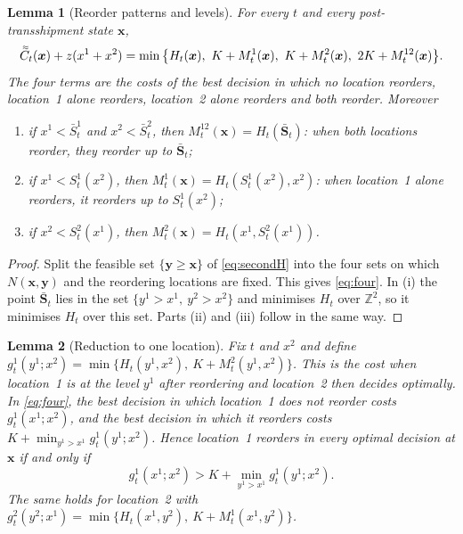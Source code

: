 \documentclass[11pt]{article}
\DeclareRobustCommand{\dbtilde}[1]{\accentset{\approx}{#1}}
\renewcommand{\vec}[1]{\boldsymbol{#1}}
\newcommand{\Z}{\mathbb{Z}}
\newcommand{\Cq}{\dbtilde{C}}
\newtheorem{lemma}{Lemma}
\theoremstyle{definition}
\begin{document}
\begin{lemma}[Reorder patterns and levels]\label{lem:patterns}
For every $t$ and every post-transshipment state $\vec{x}$,
\begin{equation}\label{eq:four}
\Cq_t(\vec{x})+z(x^1+x^2)=\min\big\{H_t(\vec{x}),\ K+M^1_t(\vec{x}),\ K+M^2_t(\vec{x}),\ 2K+M^{12}_t(\vec{x})\big\}.
\end{equation}
The four terms are the costs of the best decision in which no location reorders, location~1 alone reorders, location~2 alone reorders and both reorder. Moreover
\begin{enumerate}[label=(\roman*)]
\item if $x^1<\bar S^1_t$ and $x^2<\bar S^2_t$, then $M^{12}_t(\vec{x})=H_t(\bar{\vec{S}}_t)$: when both locations reorder, they reorder up to $\bar{\vec{S}}_t$;
\item if $x^1<S^1_t(x^2)$, then $M^1_t(\vec{x})=H_t(S^1_t(x^2),x^2)$: when location~1 alone reorders, it reorders up to $S^1_t(x^2)$;
\item if $x^2<S^2_t(x^1)$, then $M^2_t(\vec{x})=H_t(x^1,S^2_t(x^1))$.
\end{enumerate}
\end{lemma}

\begin{proof}
Split the feasible set $\{\vec{y}\ge\vec{x}\}$ of \eqref{eq:secondH} into the four sets on which $N(\vec{x},\vec{y})$ and the reordering locations are fixed. This gives \eqref{eq:four}. In (i) the point $\bar{\vec{S}}_t$ lies in the set $\{y^1>x^1,\ y^2>x^2\}$ and minimises $H_t$ over $\Z^2$, so it minimises $H_t$ over this set. Parts (ii) and (iii) follow in the same way.
\end{proof}

\begin{lemma}[Reduction to one location]\label{lem:reduction}
Fix $t$ and $x^2$ and define $g^1_t(y^1;x^2)=\min\{H_t(y^1,x^2),\ K+M^2_t(y^1,x^2)\}$. This is the cost when location~1 is at the level $y^1$ after reordering and location~2 then decides optimally. In \eqref{eq:four}, the best decision in which location~1 does not reorder costs $g^1_t(x^1;x^2)$, and the best decision in which it reorders costs $K+\min_{y^1>x^1}g^1_t(y^1;x^2)$. Hence location~1 reorders in every optimal decision at $\vec{x}$ if and only if
\begin{equation}\label{eq:reorder1}
g^1_t(x^1;x^2)>K+\min_{y^1>x^1}g^1_t(y^1;x^2).
\end{equation}
The same holds for location~2 with $g^2_t(y^2;x^1)=\min\{H_t(x^1,y^2),\ K+M^1_t(x^1,y^2)\}$.
\end{lemma}
\end{document}
